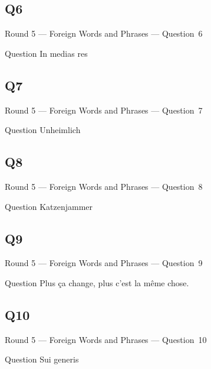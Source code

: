 \documentclass[11pt]{beamer}
\begin{document}
\subsection*{Q6}
\begin{frame}[t]{Round 5 --- Foreign Words and Phrases --- \mbox{Question 6}}
\vspace{-0.5em}
\begin{block}{Question}
In medias res
\end{block}
\end{frame}
\subsection*{Q7}
\begin{frame}[t]{Round 5 --- Foreign Words and Phrases --- \mbox{Question 7}}
\vspace{-0.5em}
\begin{block}{Question}
Unheimlich
\end{block}
\end{frame}
\subsection*{Q8}
\begin{frame}[t]{Round 5 --- Foreign Words and Phrases --- \mbox{Question 8}}
\vspace{-0.5em}
\begin{block}{Question}
Katzenjammer
\end{block}
\end{frame}
\subsection*{Q9}
\begin{frame}[t]{Round 5 --- Foreign Words and Phrases --- \mbox{Question 9}}
\vspace{-0.5em}
\begin{block}{Question}
Plus ça change, plus c'est la même chose.
\end{block}
\end{frame}
\subsection*{Q10}
\begin{frame}[t]{Round 5 --- Foreign Words and Phrases --- \mbox{Question 10}}
\vspace{-0.5em}
\begin{block}{Question}
Sui generis
\end{block}
\end{frame}
\end{document}

